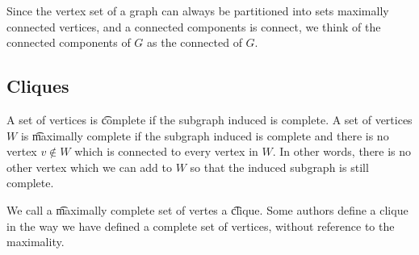 Since the vertex set of a graph can always be partitioned into sets maximally connected vertices, and a connected components is connect, we think of the connected components of $G$ as the connected  of $G$.

\subsection*{Cliques}

A set of vertices is \t{complete} if the subgraph induced is complete.
A set of vertices $W$ is \t{maximally complete} if the subgraph induced is complete and there is no vertex $v \not\in W$ which is connected to every vertex in $W$.
In other words, there is no other vertex which we can add to $W$ so that the induced subgraph is still complete.

We call a \t{maximally complete} set of vertes a \t{clique}.
Some authors define a clique in the way we have defined a complete set of vertices, without reference to the maximality.

%  
